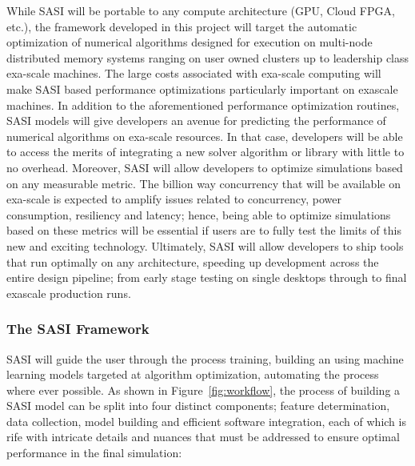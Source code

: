 While SASI will be portable to any compute architecture (GPU, Cloud FPGA, etc.), the framework developed in this project will target the automatic optimization of numerical algorithms designed for execution on multi-node distributed memory systems ranging on user owned clusters up to leadership class exa-scale machines. The large costs associated with exa-scale computing will make SASI based performance optimizations particularly important on exascale machines. In addition to the aforementioned performance optimization routines, SASI models will give developers an avenue for predicting the performance of numerical algorithms on exa-scale resources. In that case, developers will be able to access the merits of integrating a new solver algorithm or library with little to no overhead. Moreover, SASI will allow developers to optimize simulations based on any measurable metric. The billion way concurrency that will be available on exa-scale is expected to amplify issues related to concurrency, power consumption, resiliency and latency; hence, being able to optimize simulations based on these metrics will be essential if users are to fully test the limits of this new and exciting technology. Ultimately, SASI will allow developers to ship tools that run optimally on any architecture, speeding up development across the entire design pipeline; from early stage testing on single desktops through to final exascale production runs.


\subsubsection{The SASI Framework}

SASI will guide the user through the process training, building an using machine learning models targeted at algorithm optimization, automating the process  where ever possible. As shown in Figure~\ref{fig:workflow}, the process of building a SASI model can be split into four distinct components; feature determination, data collection, model building and efficient software integration, each of which is rife with intricate details and nuances that must be addressed to ensure optimal performance in the final simulation:

